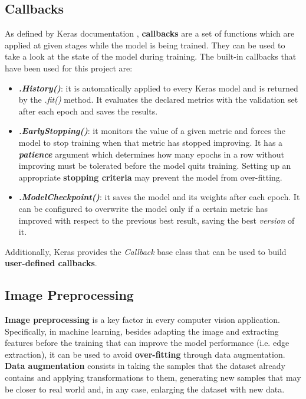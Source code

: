 \subsection{Callbacks} \label{subsec:callbacks}
As defined by Keras documentation \cite{chollet2015keras}, \textbf{callbacks} are a set of functions which are applied at given stages while the model is being trained. They can be used to take a look at the state of the model during training. The built-in callbacks that have been used for this project are:
\begin{itemize}
	\item \textbf{\textit{.History()}}: it is automatically applied to every Keras model and is returned by the \textit{.fit()} method. It evaluates the declared metrics with the validation set after each epoch and saves the results.
	
	\item \textbf{\textit{.EarlyStopping()}}: it monitors the value of a given metric and forces the model to stop training when that metric has stopped improving. It has a \textbf{\textit{patience}} argument which determines how many epochs in a row without improving must be tolerated before the model quits training. Setting up an appropriate \textbf{stopping criteria} may prevent the model from over-fitting.
	
	\item \textbf{\textit{.ModelCheckpoint()}}: it saves the model and its weights after each epoch. It can be configured to overwrite the model only if a certain metric has improved with respect to the previous best result, saving the best \textit{version} of it.
\end{itemize}

Additionally, Keras provides the \textit{Callback} base class that can be used to build \textbf{user-defined callbacks}.

\subsection{Image Preprocessing}
\textbf{Image preprocessing} is a key factor in every computer vision application. Specifically, in machine learning, besides adapting the image and extracting features before the training that can improve the model performance (i.e. edge extraction), it can be used to avoid \textbf{over-fitting} through data augmentation. \textbf{Data augmentation} \cite{DBLP:journals/corr/WongGSM16} consists in taking the samples that the dataset already contains and applying transformations to them, generating new samples that may be closer to real world and, in any case, enlarging the dataset with new data.

